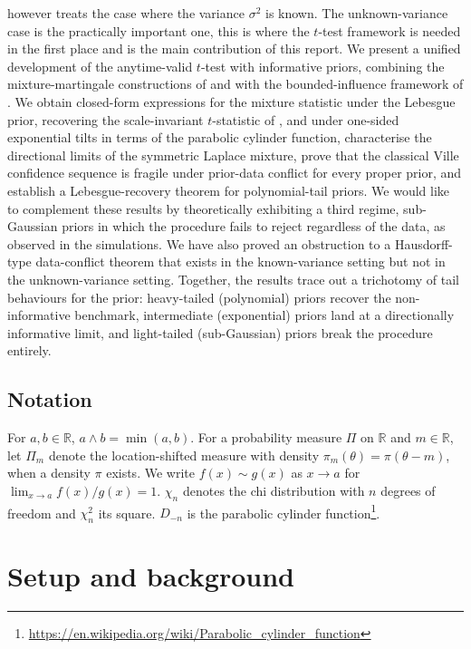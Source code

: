 \documentclass{article}%
\newcommand{\R}{\mathbb{R}}
\newcommand{\1}{\mathbf{1}}
\begin{document}
\cite{Cortinovis2025} however treats the case where the variance \(\sigma^2\) is
known. The unknown-variance case is the practically important one, this is where the \(t\)-test framework is needed in the first place and is the main contribution of this report. We present a unified development of the anytime-valid \(t\)-test with informative priors, combining the mixture-martingale constructions of \cite{Lai1976} and \cite{Wang2025} with the bounded-influence framework of \cite{Cortinovis2025}. We obtain closed-form expressions for the mixture statistic under the Lebesgue prior, recovering the scale-invariant \(t\)-statistic of \cite{Lai1976}, and under one-sided exponential tilts in terms of the parabolic cylinder function, characterise the directional limits of the symmetric Laplace mixture, prove that the classical Ville confidence sequence is fragile under prior-data conflict for every proper prior, and establish a Lebesgue-recovery theorem for polynomial-tail priors. We would like to complement these results by theoretically exhibiting a third regime, sub-Gaussian priors in which the procedure fails to reject regardless of the data, as observed in the simulations. We have also proved an obstruction to a Hausdorff-type data-conflict theorem that exists in the known-variance setting but not in the
unknown-variance setting. Together, the results trace out a trichotomy of tail behaviours for the prior: heavy-tailed (polynomial) priors recover the non-informative benchmark, intermediate (exponential) priors land at a directionally informative limit, and light-tailed (sub-Gaussian) priors break the procedure entirely.


\subsection{Notation}

For \(a,b\in\mathbb{R}\), \(a\wedge b=\min(a,b)\). For a probability measure
\(\Pi\) on \(\mathbb{R}\) and \(m\in\mathbb{R}\), let \(\Pi_m\) denote the
location-shifted measure with density \(\pi_m(\theta)=\pi(\theta-m)\),
when a density \(\pi\) exists. We write \(f(x)\sim g(x)\) as
\(x\to a\) for \(\lim_{x\to a} f(x)/g(x)=1\). %
\(\chi_n\) denotes the chi distribution with \(n\) degrees of freedom
and \(\chi_n^2\) its square. \(D_{-n}\) is the parabolic cylinder
function\footnote{\url{https://en.wikipedia.org/wiki/Parabolic_cylinder_function}}.

\section{Setup and background}\label{sec:setup}
\end{document}
